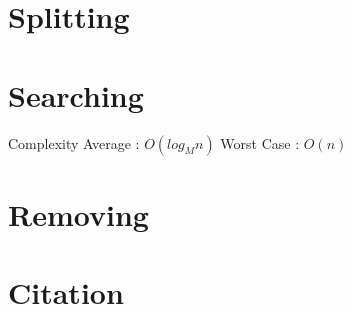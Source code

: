 \documentclass{article}
\begin{document}
\section{Splitting} 

\section{Searching}
Complexity
Average : $O(log_Mn)$
Worst Case : $O(n)$

\section{Removing}

\section{Citation}


\end{document}
